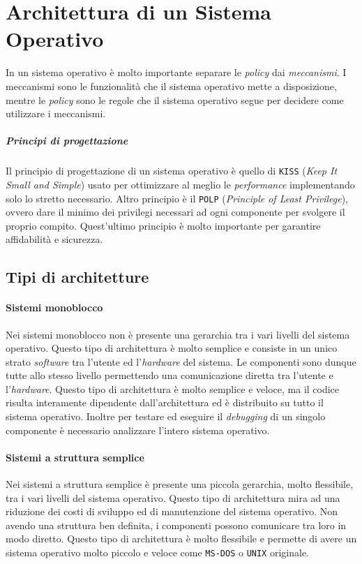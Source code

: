 \chapter{Architettura di un Sistema Operativo}

In un sistema operativo è molto importante separare le \textit{policy} dai \textit{meccanismi}. I meccanismi sono le funzionalità che il sistema operativo mette a disposizione, mentre le \textit{policy} sono le regole che il sistema operativo segue per decidere come utilizzare i meccanismi.

\paragraph{Principi di progettazione} Il principio di progettazione di un sistema operativo è quello di \texttt{KISS} (\textit{Keep It Small and Simple}) usato per ottimizzare al meglio le \textit{performance} implementando solo lo stretto necessario. Altro principio è il \texttt{POLP} (\textit{Principle of Least Privilege}), ovvero dare il minimo dei privilegi necessari ad ogni componente per svolgere il proprio compito. Quest'ultimo principio è molto importante per garantire affidabilità e sicurezza.

\section{Tipi di architetture}
    \subsubsection{Sistemi monoblocco}
        Nei sistemi monoblocco non è presente una gerarchia tra i vari livelli del sistema operativo. Questo tipo di architettura è molto semplice e consiste in un unico strato \textit{software} tra l'utente ed l'\textit{hardware} del sistema. Le componenti sono dunque tutte allo stesso livello permettendo una comunicazione diretta tra l'utente e l'\textit{hardware}. Questo tipo di architettura è molto semplice e veloce, ma il codice risulta interamente dipendente dall'architettura ed è distribuito su tutto il sistema operativo. Inoltre per testare ed eseguire il \textit{debugging} di un singolo componente è necessario analizzare l'intero sistema operativo.
    \subsubsection{Sistemi a struttura semplice}
        Nei sistemi a struttura semplice è presente una piccola gerarchia, molto flessibile, tra i vari livelli del sistema operativo. Questo tipo di architettura mira ad una riduzione dei costi di sviluppo ed di manutenzione del sistema operativo. Non avendo una struttura ben definita, i componenti possono comunicare tra loro in modo diretto. Questo tipo di architettura è molto flessibile e permette di avere un sistema operativo molto piccolo e veloce come \texttt{MS-DOS} o \texttt{UNIX} originale.
